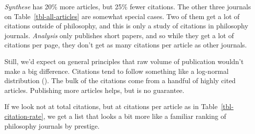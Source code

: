 \documentclass[
  11pt,
  letterpaper,
  DIV=11,
  numbers=noendperiod,
  twoside]{scrartcl}
\begin{document}
\emph{Synthese} has 20\% more articles, but 25\% fewer citations. The
other three journals on Table~\ref{tbl-all-articles} are somewhat
special cases. Two of them get a lot of citations outside of philosophy,
and this is only a study of citations in philosophy journals.
\emph{Analysis} only publishes short papers, and so while they get a lot
of citations per page, they don't get as many citations per article as
other journals.

Still, we'd expect on general principles that raw volume of publication
wouldn't make a big difference. Citations tend to follow something like
a log-normal distribution (). The bulk of the citations come from a handful of highly cited
articles. Publishing more articles helps, but is no guarantee.

If we look not at total citations, but at citations per article as in
Table~\ref{tbl-citation-rate}, we get a list that looks a bit more like
a familiar ranking of philosophy journals by prestige.
\end{document}
